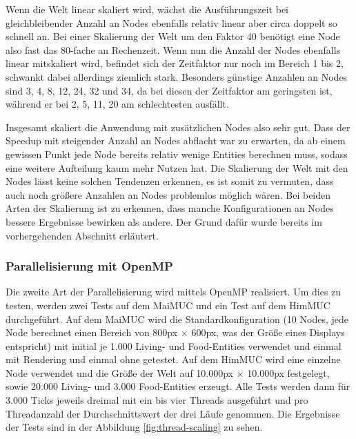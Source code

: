 \documentclass[course=erap]{aspdoc}
\begin{document}
Wenn die Welt linear skaliert wird, wächst die Ausführungszeit bei gleichbleibender Anzahl an Nodes ebenfalls relativ linear aber circa doppelt so schnell an. Bei einer Skalierung der Welt um den Faktor 40 benötigt eine Node also fast das 80-fache an Rechenzeit. Wenn nun die Anzahl der Nodes ebenfalls linear mitskaliert wird, befindet sich der Zeitfaktor nur noch im Bereich 1 bis 2, schwankt dabei allerdings ziemlich stark. Besonders günstige Anzahlen an Nodes sind 3, 4, 8, 12, 24, 32 und 34, da bei diesen der Zeitfaktor am geringsten ist, während er bei 2, 5, 11, 20 am schlechtesten ausfällt.

Insgesamt skaliert die Anwendung mit zusätzlichen Nodes also sehr gut. Dass der Speedup mit steigender Anzahl an Nodes abflacht war zu erwarten, da ab einem gewissen Punkt jede Node bereits relativ wenige Entities berechnen muss, sodass eine weitere Aufteilung kaum mehr Nutzen hat. Die Skalierung der Welt mit den Nodes lässt keine solchen Tendenzen erkennen, es ist somit zu vermuten, dass auch noch größere Anzahlen an Nodes problemlos möglich wären. Bei beiden Arten der Skalierung ist zu erkennen, dass manche Konfigurationen an Nodes bessere Ergebnisse bewirken als andere. Der Grund dafür wurde bereits im vorhergehenden Abschnitt erläutert.

\subsubsection{Parallelisierung mit OpenMP}
Die zweite Art der Parallelisierung wird mittels OpenMP realisiert. Um dies zu testen, werden zwei Tests auf dem MaiMUC und ein Test auf dem HimMUC durchgeführt. Auf dem MaiMUC wird die Standardkonfiguration (10 Nodes, jede Node berechnet einen Bereich von 800px $\times$ 600px, was der Größe eines Displays entspricht) mit initial je 1.000 Living- und Food-Entities verwendet und einmal mit Rendering und einmal ohne getestet. Auf dem HimMUC wird eine einzelne Node verwendet und die Größe der Welt auf 10.000px $\times$ 10.000px festgelegt, sowie 20.000 Living- und 3.000 Food-Entities erzeugt. Alle Tests werden dann für 3.000 Ticks jeweils dreimal mit ein bis vier Threads ausgeführt und pro Threadanzahl der Durchschnittswert der drei Läufe genommen. Die Ergebnisse der Tests sind in der Abbildung \ref{fig:thread-scaling} zu sehen.
\end{document}
